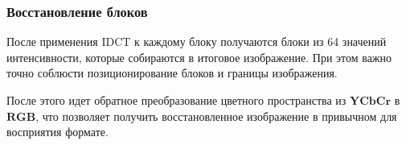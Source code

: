 \subsubsection{Восстановление блоков}
После применения IDCT к каждому блоку получаются блоки из 64 значений интенсивности, которые собираются в итоговое изображение. 
При этом важно точно соблюсти позиционирование блоков и границы изображения.

После этого идет обратное преобразование цветного пространства из $\textbf{YCbCr}$ в $\textbf{RGB}$, 
что позволяет получить восстановленное изображение в привычном для восприятия формате.



